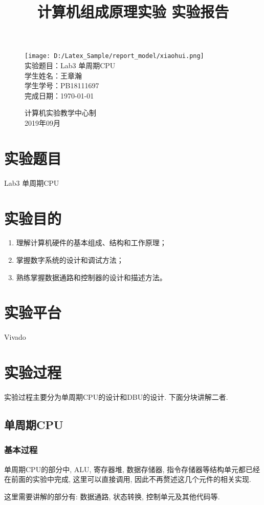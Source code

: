 \documentclass[UTF8]{article}
\title{计算机组成原理实验 实验报告}
\date{}
\begin{document}
\maketitle
\begin{figure}[H]
	\centering
	\texttt{[image: D:/Latex\_Sample/report\_model/xiaohui.png]}\vspace{0.5cm}\\
	\large{
		实验题目：Lab3 单周期CPU\\
		学生姓名：王章瀚\\
		学生学号：PB18111697\\
		完成日期：\today\\
	}\vspace{2cm}
	
	\large{计算机实验教学中心制\\2019年09月\\}
	\thispagestyle{empty}
	\clearpage  %
\end{figure}
\newpage

\section{实验题目}
Lab3 单周期CPU

\section{实验目的}
\begin{enumerate}
	\item 理解计算机硬件的基本组成、结构和工作原理；
	\item 掌握数字系统的设计和调试方法；
	\item 熟练掌握数据通路和控制器的设计和描述方法。
\end{enumerate}

\section{实验平台}
Vivado

\section{实验过程}
实验过程主要分为单周期CPU的设计和DBU的设计. 下面分块讲解二者.
\subsection{单周期CPU}
\subsubsection{基本过程}
单周期CPU的部分中, ALU, 寄存器堆, 数据存储器, 指令存储器等结构单元都已经在前面的实验中完成, 这里可以直接调用, 因此不再赘述这几个元件的相关实现.\par
这里需要讲解的部分有: 数据通路, 状态转换, 控制单元及其他代码等.\par
\end{document}
